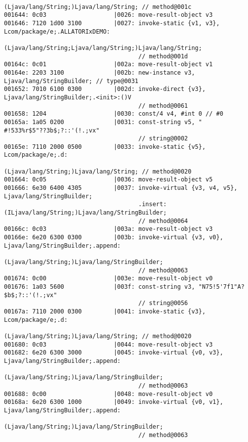 \begin{lstlisting}
                                      (Ljava/lang/String;)Ljava/lang/String; // method@001c
001644: 0c03                   |0026: move-result-object v3
001646: 7120 1d00 3100         |0027: invoke-static {v1, v3}, Lcom/package/e;.ALLATORIxDEMO:
                                      (Ljava/lang/String;Ljava/lang/String;)Ljava/lang/String;
                                      // method@001d
00164c: 0c01                   |002a: move-result-object v1
00164e: 2203 3100              |002b: new-instance v3, Ljava/lang/StringBuilder; // type@0031
001652: 7010 6100 0300         |002d: invoke-direct {v3}, Ljava/lang/StringBuilder;.<init>:()V
                                      // method@0061
001658: 1204                   |0030: const/4 v4, #int 0 // #0
00165a: 1a05 0200              |0031: const-string v5, "	#!533%r$5"??3b$;?::'(!.;vx"
                                      // string@0002
00165e: 7110 2000 0500         |0033: invoke-static {v5}, Lcom/package/e;.d:
                                      (Ljava/lang/String;)Ljava/lang/String; // method@0020
001664: 0c05                   |0036: move-result-object v5
001666: 6e30 6400 4305         |0037: invoke-virtual {v3, v4, v5}, Ljava/lang/StringBuilder;
                                      .insert:(ILjava/lang/String;)Ljava/lang/StringBuilder;
                                      // method@0064
00166c: 0c03                   |003a: move-result-object v3
00166e: 6e20 6300 0300         |003b: invoke-virtual {v3, v0}, Ljava/lang/StringBuilder;.append:
                                      (Ljava/lang/String;)Ljava/lang/StringBuilder;
                                      // method@0063
001674: 0c00                   |003e: move-result-object v0
001676: 1a03 5600              |003f: const-string v3, "N75!5'7f1"A?$b$;?::'(!.;vx"
                                      // string@0056
00167a: 7110 2000 0300         |0041: invoke-static {v3}, Lcom/package/e;.d:
                                     (Ljava/lang/String;)Ljava/lang/String; // method@0020
001680: 0c03                   |0044: move-result-object v3
001682: 6e20 6300 3000         |0045: invoke-virtual {v0, v3}, Ljava/lang/StringBuilder;.append:
                                      (Ljava/lang/String;)Ljava/lang/StringBuilder;
                                      // method@0063
001688: 0c00                   |0048: move-result-object v0
00168a: 6e20 6300 1000         |0049: invoke-virtual {v0, v1}, Ljava/lang/StringBuilder;.append:
                                      (Ljava/lang/String;)Ljava/lang/StringBuilder;
                                      // method@0063

\end{lstlisting}
